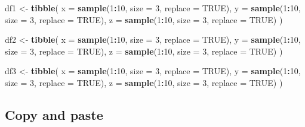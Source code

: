 \documentclass[
]{book}
\newenvironment{Shaded}{\begin{snugshade}}{\end{snugshade}}
\newcommand{\DataTypeTok}[1]{\textcolor[rgb]{0.13,0.29,0.53}{#1}}
\newcommand{\DecValTok}[1]{\textcolor[rgb]{0.00,0.00,0.81}{#1}}
\newcommand{\KeywordTok}[1]{\textcolor[rgb]{0.13,0.29,0.53}{\textbf{#1}}}
\newcommand{\NormalTok}[1]{#1}
\newcommand{\OperatorTok}[1]{\textcolor[rgb]{0.81,0.36,0.00}{\textbf{#1}}}
\newcommand{\OtherTok}[1]{\textcolor[rgb]{0.56,0.35,0.01}{#1}}
\newcommand{\StringTok}[1]{\textcolor[rgb]{0.31,0.60,0.02}{#1}}
\begin{document}
\begin{Shaded}
\begin{Highlighting}[]
\NormalTok{df1 \textless{}{-}}\StringTok{ }\KeywordTok{tibble}\NormalTok{(}
  \DataTypeTok{x =} \KeywordTok{sample}\NormalTok{(}\DecValTok{1}\OperatorTok{:}\DecValTok{10}\NormalTok{, }\DataTypeTok{size =} \DecValTok{3}\NormalTok{, }\DataTypeTok{replace =} \OtherTok{TRUE}\NormalTok{),}
  \DataTypeTok{y =} \KeywordTok{sample}\NormalTok{(}\DecValTok{1}\OperatorTok{:}\DecValTok{10}\NormalTok{, }\DataTypeTok{size =} \DecValTok{3}\NormalTok{, }\DataTypeTok{replace =} \OtherTok{TRUE}\NormalTok{),}
  \DataTypeTok{z =} \KeywordTok{sample}\NormalTok{(}\DecValTok{1}\OperatorTok{:}\DecValTok{10}\NormalTok{, }\DataTypeTok{size =} \DecValTok{3}\NormalTok{, }\DataTypeTok{replace =} \OtherTok{TRUE}\NormalTok{)}
\NormalTok{)}

\NormalTok{df2 \textless{}{-}}\StringTok{ }\KeywordTok{tibble}\NormalTok{(}
  \DataTypeTok{x =} \KeywordTok{sample}\NormalTok{(}\DecValTok{1}\OperatorTok{:}\DecValTok{10}\NormalTok{, }\DataTypeTok{size =} \DecValTok{3}\NormalTok{, }\DataTypeTok{replace =} \OtherTok{TRUE}\NormalTok{),}
  \DataTypeTok{y =} \KeywordTok{sample}\NormalTok{(}\DecValTok{1}\OperatorTok{:}\DecValTok{10}\NormalTok{, }\DataTypeTok{size =} \DecValTok{3}\NormalTok{, }\DataTypeTok{replace =} \OtherTok{TRUE}\NormalTok{),}
  \DataTypeTok{z =} \KeywordTok{sample}\NormalTok{(}\DecValTok{1}\OperatorTok{:}\DecValTok{10}\NormalTok{, }\DataTypeTok{size =} \DecValTok{3}\NormalTok{, }\DataTypeTok{replace =} \OtherTok{TRUE}\NormalTok{)}
\NormalTok{)}

\NormalTok{df3 \textless{}{-}}\StringTok{ }\KeywordTok{tibble}\NormalTok{(}
  \DataTypeTok{x =} \KeywordTok{sample}\NormalTok{(}\DecValTok{1}\OperatorTok{:}\DecValTok{10}\NormalTok{, }\DataTypeTok{size =} \DecValTok{3}\NormalTok{, }\DataTypeTok{replace =} \OtherTok{TRUE}\NormalTok{),}
  \DataTypeTok{y =} \KeywordTok{sample}\NormalTok{(}\DecValTok{1}\OperatorTok{:}\DecValTok{10}\NormalTok{, }\DataTypeTok{size =} \DecValTok{3}\NormalTok{, }\DataTypeTok{replace =} \OtherTok{TRUE}\NormalTok{),}
  \DataTypeTok{z =} \KeywordTok{sample}\NormalTok{(}\DecValTok{1}\OperatorTok{:}\DecValTok{10}\NormalTok{, }\DataTypeTok{size =} \DecValTok{3}\NormalTok{, }\DataTypeTok{replace =} \OtherTok{TRUE}\NormalTok{)}
\NormalTok{)}
\end{Highlighting}
\end{Shaded}

\hypertarget{copy-and-paste}{%
\subsection{Copy and paste}\label{copy-and-paste}}
\end{document}
